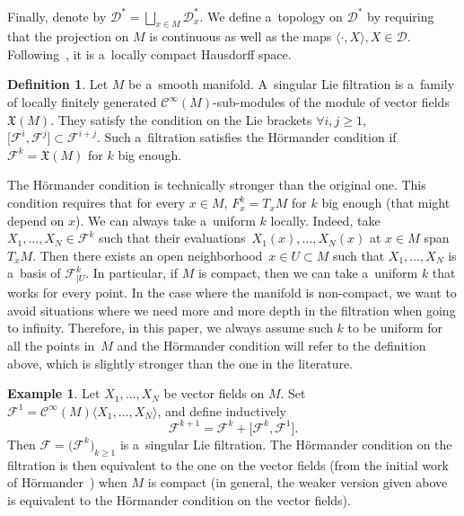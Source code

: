 \documentclass[pdftex]{sigma}
\newcommand{\CCC}{\mathscr{C}} %
\newcommand{\F}{\mathcal{F}} %
\newcommand{\lag}{\langle}
\newcommand{\rag}{\rangle}
\newcommand{\Fb}{\mathcal{F}} %
\numberwithin{equation}{section}
\theoremstyle{definition}
\newtheorem{mydef}[thm]{Definition}
\newtheorem{ex}[thm]{Example}
\begin{document}
Finally, denote by $\mathcal{D}^* = \bigsqcup_{x\in M}\mathcal{D}_x^*$. We define a~topology on $\mathcal{D}^*$ by requiring that the projection on $M$ is continuous as well as the maps $\lag \cdot, X \rag, X\in \mathcal{D}$. Following~\cite[Proposition~2.10]{AndroulidakisSkandalisPseudoDiff}, it is a~locally compact Hausdorff space.

\begin{mydef}
 Let $M$ be a~smooth manifold. A~singular Lie filtration is a~family \smash{$\Fb = \bigl(\F^j\bigr){}_{j\geq 1}$} of locally finitely generated $\CCC^{\infty}(M)$-sub-modules of the module of vector fields $\mathfrak{X}(M)$. They satisfy the condition on the Lie brackets $\forall i,j\geq 1$, $\big[\F^i,\F^j\big] \subset \F^{i+j}$.
 Such a~filtration satisfies the H\"ormander condition if $\F^k = \mathfrak{X}(M)$ for $k$ big enough.
\end{mydef}

The H\"ormander condition is technically stronger than the original one. This condition requires that for every $x\in M$, $F^k_x = T_xM$ for $k$ big enough (that might depend on $x$). We can always take a~uniform $k$ locally. Indeed, take $X_1,\dots,X_N \in \F^k$ such that their evaluations~${X_1(x),\dots,X_N(x)}$ at $x\in M$ span $T_xM$. Then there exists an open neighborhood~${x\in U\subset M}$ such that $X_1, \dots, X_N$ is a~basis of $\F^k_{|U}$. In particular, if $M$ is compact, then we can take a~uniform $k$ that works for every point. In the case where the manifold is non-compact, we want to avoid situations where we need more and more depth in the filtration when going to infinity. Therefore, in this paper, we always assume such $k$ to be uniform for all the points in~$M$ and the H\"ormander condition will refer to the definition above, which is slightly stronger than the one in the literature.

\begin{ex}
 Let $X_1, \dots, X_N$ be vector fields on $M$. Set $\F^1 = \CCC^{\infty}(M)\lag X_1,\dots,X_N\rag$, and define inductively
 \[\F^{k+1} = \F^k + \big[\F^k,\F^1\big].\] Then $\F = \bigl(\F^k\bigr)_{k\geq 1}$ is a~singular Lie filtration. The H\"ormander condition on the filtration is then equivalent to the one on the vector fields (from the initial work of H\"ormander~\cite{Hormander}) when $M$ is compact (in general, the weaker version given above is equivalent to the H\"ormander condition on the vector fields).
\end{ex}
\end{document}
